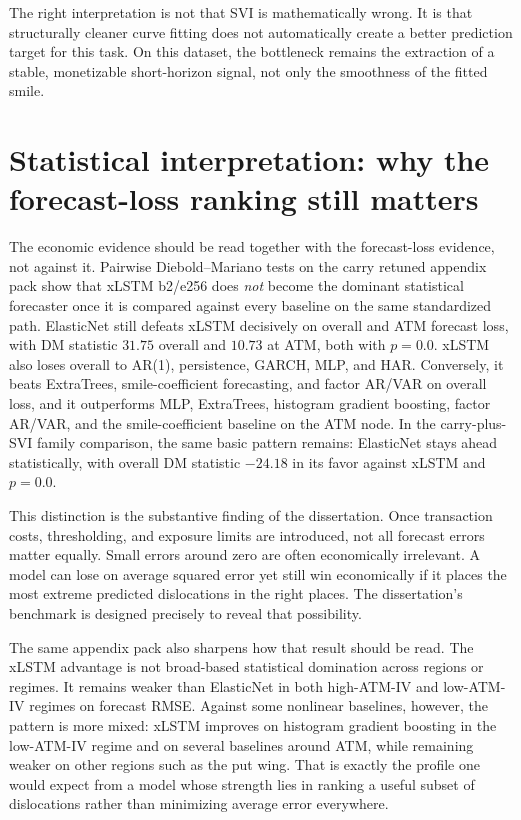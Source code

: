 \documentclass[12pt]{report}
\begin{document}
The right interpretation is not that SVI is mathematically wrong. It is that structurally cleaner curve fitting does not automatically create a better prediction target for this task. On this dataset, the bottleneck remains the extraction of a stable, monetizable short-horizon signal, not only the smoothness of the fitted smile.

\section{Statistical interpretation: why the forecast-loss ranking still matters}
The economic evidence should be read together with the forecast-loss evidence, not against it. Pairwise Diebold--Mariano tests \citep{diebold1995} on the carry retuned appendix pack show that xLSTM b2/e256 does \emph{not} become the dominant statistical forecaster once it is compared against every baseline on the same standardized path. ElasticNet still defeats xLSTM decisively on overall and ATM forecast loss, with DM statistic \(31.75\) overall and \(10.73\) at ATM, both with \(p=0.0\). xLSTM also loses overall to AR(1), persistence, GARCH, MLP, and HAR. Conversely, it beats ExtraTrees, smile-coefficient forecasting, and factor AR/VAR on overall loss, and it outperforms MLP, ExtraTrees, histogram gradient boosting, factor AR/VAR, and the smile-coefficient baseline on the ATM node. In the carry-plus-SVI family comparison, the same basic pattern remains: ElasticNet stays ahead statistically, with overall DM statistic \(-24.18\) in its favor against xLSTM and \(p=0.0\).

This distinction is the substantive finding of the dissertation. Once transaction costs, thresholding, and exposure limits are introduced, not all forecast errors matter equally. Small errors around zero are often economically irrelevant. A model can lose on average squared error yet still win economically if it places the most extreme predicted dislocations in the right places. The dissertation's benchmark is designed precisely to reveal that possibility.

The same appendix pack also sharpens how that result should be read. The xLSTM advantage is not broad-based statistical domination across regions or regimes. It remains weaker than ElasticNet in both high-ATM-IV and low-ATM-IV regimes on forecast RMSE. Against some nonlinear baselines, however, the pattern is more mixed: xLSTM improves on histogram gradient boosting in the low-ATM-IV regime and on several baselines around ATM, while remaining weaker on other regions such as the put wing. That is exactly the profile one would expect from a model whose strength lies in ranking a useful subset of dislocations rather than minimizing average error everywhere.
\end{document}
